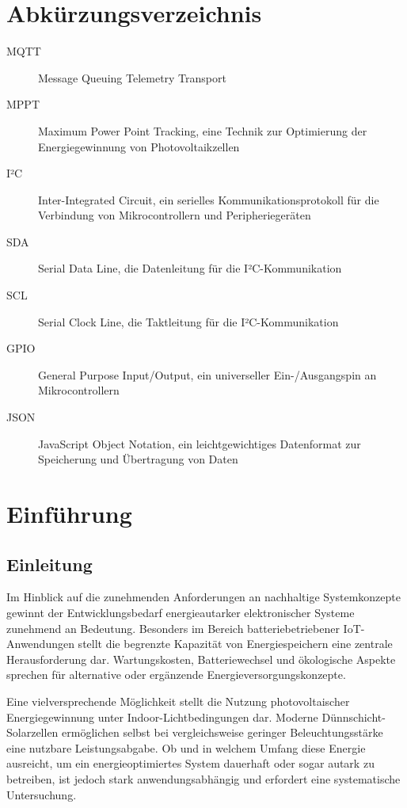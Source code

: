 \documentclass{article}
\begin{document}
\section*{Abkürzungsverzeichnis}
\begin{description}
    \item[MQTT] Message Queuing Telemetry Transport
    \item[MPPT] Maximum Power Point Tracking, eine Technik zur Optimierung der Energiegewinnung von Photovoltaikzellen 
    \item[I²C] Inter-Integrated Circuit, ein serielles Kommunikationsprotokoll für die Verbindung von Mikrocontrollern und Peripheriegeräten 
    \item[SDA] Serial Data Line, die Datenleitung für die I²C-Kommunikation
    \item[SCL] Serial Clock Line, die Taktleitung für die I²C-Kommunikation
    \item[GPIO] General Purpose Input/Output, ein universeller Ein-/Ausgangspin an Mikrocontrollern
    \item[JSON] JavaScript Object Notation, ein leichtgewichtiges Datenformat zur Speicherung und Übertragung von Daten
\end{description}

\clearpage
{}

\section{Einführung}
\subsection{Einleitung}

Im Hinblick auf die zunehmenden Anforderungen an nachhaltige Systemkonzepte gewinnt der Entwicklungsbedarf energieautarker 
elektronischer Systeme zunehmend an Bedeutung. 
Besonders im Bereich batteriebetriebener IoT-Anwendungen stellt die begrenzte Kapazität von Energiespeichern eine zentrale Herausforderung dar. 
Wartungskosten, Batteriewechsel und ökologische Aspekte sprechen für alternative oder ergänzende Energieversorgungskonzepte.

Eine vielversprechende Möglichkeit stellt die Nutzung photovoltaischer Energiegewinnung unter Indoor-Lichtbedingungen dar. 
Moderne Dünnschicht-Solarzellen ermöglichen selbst bei vergleichsweise geringer Beleuchtungsstärke eine nutzbare Leistungsabgabe. 
Ob und in welchem Umfang diese Energie ausreicht, um ein energieoptimiertes System dauerhaft oder sogar autark zu betreiben, 
ist jedoch stark anwendungsabhängig und erfordert eine systematische Untersuchung.
\end{document}
